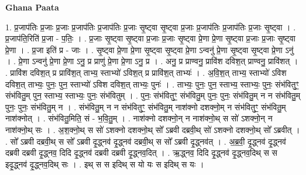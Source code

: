 \documentclass[17pt]{extarticle}
\begin{document}
\textbf{Ghana Paata } \newline

1. प्र॒जाप॑तिः प्र॒जाः प्र॒जाः प्र॒जाप॑तिः प्र॒जाप॑तिः प्र॒जाः सृ॒ष्ट्वा सृ॒ष्ट्वा प्र॒जाः प्र॒जाप॑तिः प्र॒जाप॑तिः प्र॒जाः सृ॒ष्ट्वा । . प्र॒जाप॑ति॒रिति॑ प्र॒जा - प॒तिः॒ । . प्र॒जाः सृ॒ष्ट्वा सृ॒ष्ट्वा प्र॒जाः प्र॒जाः सृ॒ष्ट्वा प्रे॒णा प्रे॒णा सृ॒ष्ट्वा प्र॒जाः प्र॒जाः सृ॒ष्ट्वा प्रे॒णा । . प्र॒जा इति॑ प्र - जाः । . सृ॒ष्ट्वा प्रे॒णा प्रे॒णा सृ॒ष्ट्वा सृ॒ष्ट्वा प्रे॒णा ऽन्वनु॑ प्रे॒णा सृ॒ष्ट्वा सृ॒ष्ट्वा प्रे॒णा ऽनु॑ । . प्रे॒णा ऽन्वनु॑ प्रे॒णा प्रे॒णा ऽनु॒ प्र प्राणु॑ प्रे॒णा प्रे॒णा ऽनु॒ प्र । . अनु॒ प्र प्राण्वनु॒ प्रावि॑श दविश॒त् प्राण्वनु॒ प्रावि॑शत् । . प्रावि॑श दविश॒त् प्र प्रावि॑श॒त् ताभ्य॒ स्ताभ्यो॑ ऽविश॒त् प्र प्रावि॑श॒त् ताभ्यः॑ । . अ॒वि॒श॒त् ताभ्य॒ स्ताभ्यो॑ ऽविश दविश॒त् ताभ्यः॒ पुनः॒ पुन॒ स्ताभ्यो॑ ऽविश दविश॒त् ताभ्यः॒ पुनः॑ । . ताभ्यः॒ पुनः॒ पुन॒ स्ताभ्य॒ स्ताभ्यः॒ पुनः॒ संभ॑वितुꣳ॒॒ संभ॑वितु॒म् पुन॒ स्ताभ्य॒ स्ताभ्यः॒ पुनः॒ संभ॑वितुम् । . पुनः॒ संभ॑वितुꣳ॒॒ संभ॑वितु॒म् पुनः॒ पुनः॒ संभ॑वितु॒म् न न संभ॑वितु॒म् पुनः॒ पुनः॒ संभ॑वितु॒म् न । . संभ॑वितु॒म् न न संभ॑वितुꣳ॒॒ संभ॑वितु॒म् नाश॑क्नो दशक्नो॒म् न संभ॑वितुꣳ॒॒ संभ॑वितु॒म् नाश॑क्नोत् । . संभ॑वितु॒मिति॒ सं - भ॒वि॒तु॒म् । . नाश॑क्नो दशक्नो॒न् न नाश॑क्नो॒थ् स सो॑ ऽशक्नो॒न् न नाश॑क्नो॒थ् सः । . अ॒श॒क्नो॒थ् स सो॑ ऽशक्नो दशक्नो॒थ् सो᳚ ऽब्रवी दब्रवी॒थ् सो॑ ऽशक्नो दशक्नो॒थ् सो᳚ ऽब्रवीत् । . सो᳚ ऽब्रवी दब्रवी॒थ् स सो᳚ ऽब्रवी दृ॒द्ध्नव॑ दृ॒द्ध्नव॑ दब्रवी॒थ् स सो᳚ ऽब्रवी दृ॒द्ध्नव॑त् । . अ॒ब्र॒वी॒ दृ॒द्ध्नव॑ दृ॒द्ध्नव॑ दब्रवी दब्रवी दृ॒द्ध्नव॒ दिदि दृ॒द्ध्नव॑ दब्रवी दब्रवी दृ॒द्ध्नव॒दित् । . ऋ॒द्ध्नव॒ दिदि दृ॒द्ध्नव॑ दृ॒द्ध्नव॒दिथ् स स इदृ॒द्ध्नव॑ दृ॒द्ध्नव॒दिथ् सः । . इथ् स स इदिथ् स यो यः स इदिथ् स यः । \newline
\end{document}
